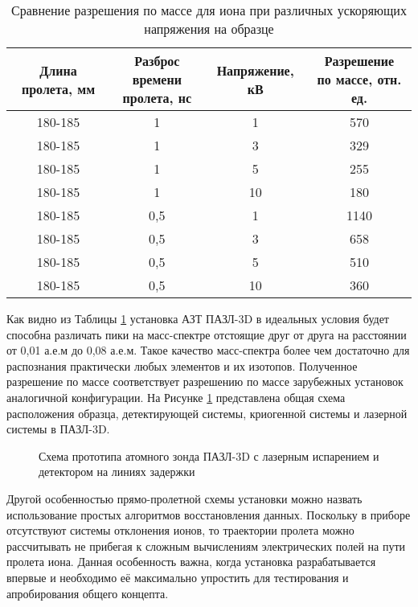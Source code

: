 \begin{table} [htbp]
	\centering
	\caption{Сравнение разрешения по массе для иона при различных ускоряющих напряжения на образце}
	\label{tab:calcFWHM}
	\begin{SingleSpace}
		\begin{tabular} {| c | c | c | c |}
			\hline
			Длина пролета, мм & \thead{Разброс времени\\ пролета, нс} & Напряжение, кВ & \thead{Разрешение \\по массе, отн. ед.}  \\ \hline
			180-185 & 1 & 1  &  570               \\ \hline
			180-185 & 1 & 3  &  329               \\ \hline
			180-185 & 1 & 5  &  255               \\ \hline
			180-185 & 1 & 10 &  180               \\ \hline
			180-185 & 0,5 & 1  &  1140               \\ \hline
			180-185 & 0,5 & 3  &  658               \\ \hline
			180-185 & 0,5 & 5  &  510               \\ \hline
			180-185 & 0,5 & 10 &  360               \\ \hline
		\end{tabular}
	\end{SingleSpace}
\end{table}

Как видно из Таблицы \cref{tab:calcFWHM} установка АЗТ ПАЗЛ-3D в идеальных условия будет способна различать пики на масс-спектре отстоящие друг от друга на расстоянии от 0,01 а.е.м до 0,08 а.е.м. Такое качество масс-спектра более чем достаточно для распознания практически любых элементов и их изотопов. Полученное разрешение по массе соответствует разрешению по массе зарубежных установок аналогичной конфигурации. На Рисунке \cref{fig:main_scheme} представлена общая схема расположения образца, детектирующей системы, криогенной системы и лазерной системы в ПАЗЛ-3D.

\begin{figure}[htb]
	\caption{Схема прототипа атомного зонда ПАЗЛ-3D с лазерным испарением и детектором на линиях задержки}
	\label{fig:main_scheme}
\end{figure}
  
Другой особенностью прямо-пролетной схемы установки можно назвать использование простых алгоритмов восстановления данных. Поскольку в приборе отсутствуют системы отклонения ионов, то траектории пролета можно рассчитывать не прибегая к сложным вычислениям электрических полей на пути пролета иона. Данная особенность важна, когда установка разрабатывается впервые и необходимо её максимально упростить для тестирования и апробирования общего концепта.


